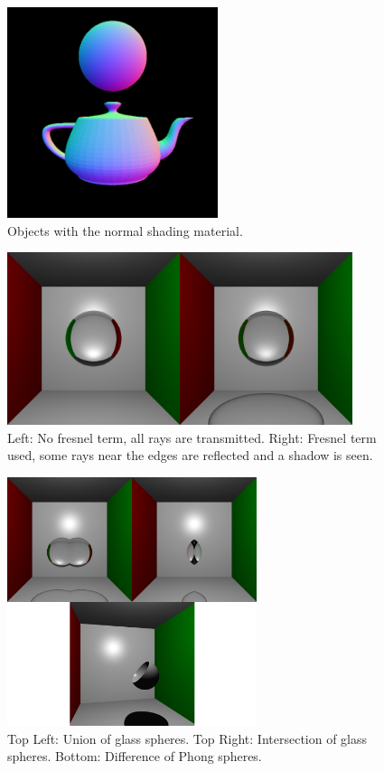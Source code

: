 \documentclass[a4paper]{article}
\begin{document}
\begin{figure}[h]
    \centering
    \includegraphics[width = 0.55\textwidth]{images/normalshading.png}
    \caption{Objects with the normal shading material.}\label{fig:normalshading}
\end{figure}

\begin{figure}[h]
    \centering
    \includegraphics[width = 0.9\textwidth]{images/fresnelcomp.png}
    \caption{Left: No fresnel term, all rays are transmitted. Right: Fresnel term used, some rays near the edges are reflected and a shadow is seen.}\label{fig:fresnel}
\end{figure}

\begin{figure}[h]
    \centering
    \includegraphics[width = 0.65\textwidth]{images/csgtypes.png}
    \caption{Top Left: Union of glass spheres. Top Right: Intersection of glass spheres. Bottom: Difference of Phong spheres.}\label{fig:csgtypes}
\end{figure}
\end{document}

